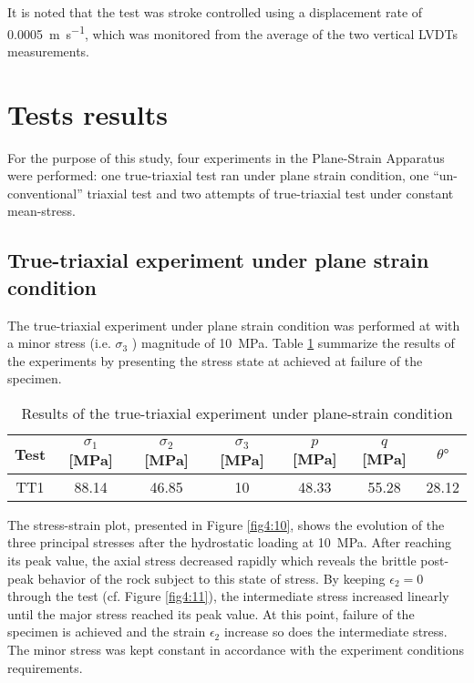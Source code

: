 It is noted that the test was stroke controlled using a displacement rate of \SI{0.0005}{\meter\per\second}, which was monitored from the average of the two vertical LVDTs measurements. 

\section{Tests results}

For the purpose of this study, four experiments in the Plane-Strain Apparatus were performed: one true-triaxial test ran under plane strain condition, one “un-conventional” triaxial test and two attempts of true-triaxial test under constant mean-stress. 

\subsection{True-triaxial experiment under plane strain condition}

The true-triaxial experiment under plane strain condition was performed at with a minor stress (i.e. $\sigma_3$ ) magnitude of \SI{10}{MPa}. Table \ref{tb4:TT1} summarize the results of the experiments by presenting the stress state at achieved at failure of the specimen.

\begin{table}
    \centering
    \begin{tabular}{ccccccc}
        \hline
        Test & $\sigma_1$ [\si{MPa}] & $\sigma_2$ [\si{MPa}] & $\sigma_3$ [\si{MPa}] & $p$ [\si{MPa}] & $q$ [\si{MPa}] & $\theta \si{\degree}$ \\
        \hline
        \hline
        TT1 &88.14 & 46.85 & 10 & 48.33 & 55.28 & 28.12 \\
        \hline
    \end{tabular}
    \caption{Results of the true-triaxial experiment under plane-strain condition}
    \label{tb4:TT1}
\end{table}

The stress-strain plot, presented in Figure \ref{fig4:10}, shows the evolution of the three principal stresses after the hydrostatic loading at \SI{10}{MPa}. After reaching its peak value, the axial stress decreased rapidly which reveals the brittle post-peak behavior of the rock subject to this state of stress.  By keeping $\epsilon_2 = 0$  through the test (cf. Figure \ref{fig4:11}), the intermediate stress increased linearly until the major stress reached its peak value. At this point, failure of the specimen is achieved and the strain $\epsilon_2$ increase so does the intermediate stress. The minor stress was kept constant in accordance with the experiment conditions requirements.

